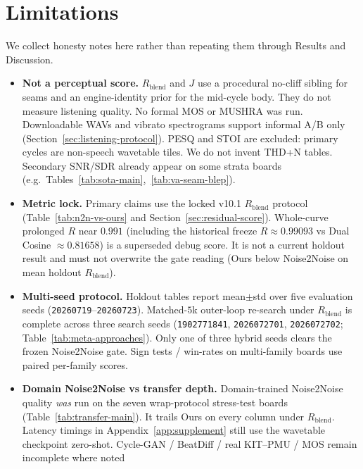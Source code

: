 \section{Limitations}
\label{sec:limitations}

We collect honesty notes here rather than repeating them through Results and Discussion.

\begin{itemize}
  \item \textbf{Not a perceptual score.}
    $R_{\mathrm{blend}}$ and $J$ use a procedural no-cliff sibling for seams and an engine-identity prior for the mid-cycle body.
    They do not measure listening quality.
    No formal MOS or MUSHRA was run.
    Downloadable WAVs and vibrato spectrograms support informal A/B only (Section~\ref{sec:listening-protocol}).
    PESQ and STOI are excluded: primary cycles are non-speech wavetable tiles.
    We do not invent THD+N tables.
    Secondary SNR/SDR already appear on some strata boards (e.g.\ Tables~\ref{tab:sota-main},~\ref{tab:va-seam-blep}).
  \item \textbf{Metric lock.}
    Primary claims use the locked v10.1 $R_{\mathrm{blend}}$ protocol
    (Table~\ref{tab:n2n-vs-ours} and Section~\ref{sec:residual-score}).
    Whole-curve prolonged $R$ near $0.991$ (including the historical freeze $R{\approx}0.99093$ vs Dual Cosine ${\approx}0.81658$)
    is a superseded debug score.
    It is not a current holdout result and must not overwrite the gate reading
    (Ours below Noise2Noise on mean holdout $R_{\mathrm{blend}}$).
  \item \textbf{Multi-seed protocol.}
    Holdout tables report mean$\pm$std over five evaluation seeds
    (\texttt{20260719}--\texttt{20260723}).
    Matched-$5$k outer-loop re-search under $R_{\mathrm{blend}}$ is complete across three search seeds
    (\texttt{1902771841}, \texttt{2026072701}, \texttt{2026072702}; Table~\ref{tab:meta-approaches}).
    Only one of three hybrid seeds clears the frozen Noise2Noise gate.
    Sign tests / win-rates on multi-family boards use paired per-family scores.
  \item \textbf{Domain Noise2Noise vs transfer depth.}
    Domain-trained Noise2Noise quality \emph{was} run on the seven wrap-protocol stress-test boards
    (Table~\ref{tab:transfer-main}). It trails Ours on every column under $R_{\mathrm{blend}}$.
    Latency timings in Appendix~\ref{app:supplement} still use the wavetable checkpoint zero-shot.
    Cycle-GAN / BeatDiff / real KIT--PMU / MOS remain incomplete where noted

\end{itemize}
